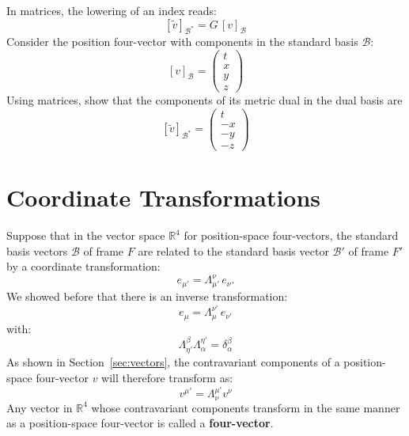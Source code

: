 \documentclass[12pt]{article}
\begin{document}
\exercise
In matrices, the lowering of an index reads:
$$[\tilde{v}]_\mathcal{B^*} = G \, [v]_\mathcal{B}$$
Consider the position four-vector with components in the standard basis $\mathcal{B}$:
$$[v]_\mathcal{B} = \begin{pmatrix} t \\ x \\ y \\ z\end{pmatrix}$$
Using matrices, show that the components of its metric dual in the
dual basis are
$$[\tilde{v}]_{\mathcal{B}^*} = \begin{pmatrix} t \\ -x \\ -y \\ -z\end{pmatrix}$$

\section{Coordinate Transformations}

Suppose that in the vector space $\mathbb{R}^4$ for position-space
four-vectors, the standard basis vectors $\mathcal{B}$ of frame $F$
are related to the standard basis vector $\mathcal{B}'$ of frame $F'$
by a coordinate transformation:
$$e_{\mu'} = \Lambda^{\nu}_{\mu'} \, e_{\nu}.$$
We showed before that there is an inverse transformation:
$$e_{\mu} = \Lambda^{\nu'}_{\mu} \, e_{\nu'}$$
with:
$$\Lambda^{\beta}_{\eta'} \Lambda^{\eta'}_{\alpha} = \delta^{\beta}_{\alpha}$$
As shown in Section~\ref{sec:vectors}, the contravariant components of
a position-space four-vector $v$ will therefore transform as:
$$v^{\mu'} = \Lambda^{\mu'}_{\nu} v^{\nu}$$
Any vector in $\mathbb{R}^4$ whose contravariant components transform
in the same manner as a position-space four-vector is called a {\bf
  four-vector}.\\[3pt]
\end{document}
